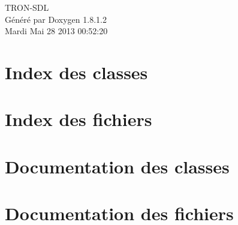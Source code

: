 \documentclass{book}
\begin{document}
\hypersetup{pageanchor=false,citecolor=blue}
\begin{titlepage}
\vspace*{7cm}
\begin{center}
{\Large T\-R\-O\-N-\/\-S\-D\-L }\\
\vspace*{1cm}
{\large Généré par Doxygen 1.8.1.2}\\
\vspace*{0.5cm}
{\small Mardi Mai 28 2013 00:52:20}\\
\end{center}
\end{titlepage}
\clearemptydoublepage
{}
\tableofcontents
\clearemptydoublepage
{}
\hypersetup{pageanchor=true,citecolor=blue}
\chapter{Index des classes}

\chapter{Index des fichiers}

\chapter{Documentation des classes}












\chapter{Documentation des fichiers}




























\printindex
\end{document}
